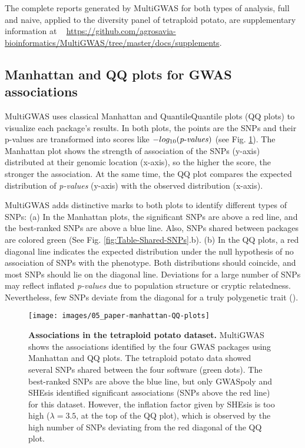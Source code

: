 \documentclass{article}
\begin{document}
The complete reports generated by MultiGWAS for both types of analysis, full and naive, applied to the diversity panel of tetraploid potato, are supplementary information at ~ \url{https://github.com/agrosavia-bioinformatics/MultiGWAS/tree/master/docs/supplements}.



\subsection{Manhattan and QQ plots for GWAS associations }

MultiGWAS uses classical Manhattan and Quantile\textendash Quantile plots (QQ plots) to visualize each package's results. In both plots, the points are the SNPs and their p-values are transformed into scores like $-log_{10}({\operatorname{\mathit{p-values}}})$ (see Fig. \ref{fig:view-qqmanhattan}). The Manhattan plot shows the strength of association of the SNPs (y-axis) distributed at their genomic location (x-axis), so the higher the score, the stronger the association. At the same time, the QQ plot compares the expected distribution of \emph{p-values} (y-axis) with the observed distribution (x-axis).

MultiGWAS adds distinctive marks to both plots to identify different types of SNPs: (a) In the Manhattan plots, the significant SNPs are above a red line, and the best-ranked SNPs are above a blue line. Also, SNPs shared between packages are colored green (See Fig. \ref{fig:Table-Shared-SNPs}.b). (b) In the QQ plots, a red diagonal line indicates the expected distribution under the null hypothesis of no association of SNPs with the phenotype. Both distributions should coincide, and most SNPs should lie on the diagonal line. Deviations for a large number of SNPs may reflect inflated {\emph{p-values }}due to population structure or cryptic relatedness. Nevertheless, few SNPs deviate from the diagonal for a truly polygenetic trait (\cite{Power2016}).

\begin{figure}[H]
\begin{centering}
\texttt{[image: images/05\_paper-manhattan-QQ-plots]}
\par\end{centering}
\caption{\textbf{{Associations in the tetraploid potato dataset.}} MultiGWAS shows the associations identified by the four GWAS packages using Manhattan and QQ plots. The tetraploid potato data showed several SNPs shared between the four software (green dots). The best-ranked SNPs are above the blue line, but only GWASpoly and SHEsis identified significant associations (SNPs above the red line) for this dataset. However, the inflation factor given by SHEsis is too high ($\lambda=3.5$, at the top of the QQ plot), which is observed by the high number of SNPs deviating from the red diagonal of the QQ plot. \label{fig:view-qqmanhattan}}
\end{figure}
\end{document}
